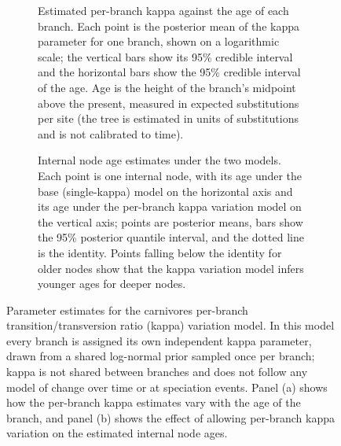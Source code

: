 \begin{figure}
    \centering
    \begin{subfigure}[t]{0.4\linewidth}
        \caption{Estimated per-branch kappa against the age of each branch. Each point is the posterior mean of the kappa parameter for one branch, shown on a logarithmic scale; the vertical bars show its 95\% credible interval and the horizontal bars show the 95\% credible interval of the age. Age is the height of the branch's midpoint above the present, measured in expected substitutions per site (the tree is estimated in units of substitutions and is not calibrated to time).}
        \label{fig:carnivoreskappa}
    \end{subfigure}
    \begin{subfigure}[t]{0.4\linewidth}
        \caption{Internal node age estimates under the two models. Each point is one internal node, with its age under the base (single-kappa) model on the horizontal axis and its age under the per-branch kappa variation model on the vertical axis; points are posterior means, bars show the 95\% posterior quantile interval, and the dotted line is the identity. Points falling below the identity for older nodes show that the kappa variation model infers younger ages for deeper nodes.}
        \label{fig:carnivorestree}
    \end{subfigure}
    \caption{Parameter estimates for the carnivores per-branch transition/transversion ratio (kappa) variation model. In this model every branch is assigned its own independent kappa parameter, drawn from a shared log-normal prior sampled once per branch; kappa is not shared between branches and does not follow any model of change over time or at speciation events. Panel (a) shows how the per-branch kappa estimates vary with the age of the branch, and panel (b) shows the effect of allowing per-branch kappa variation on the estimated internal node ages.}
\end{figure}

